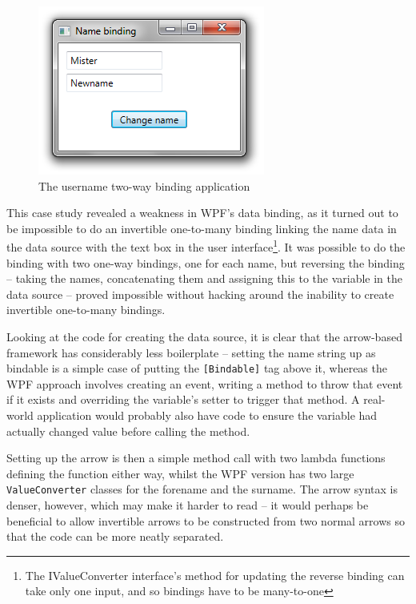 \documentclass[12pt,twoside,notitlepage]{report}
\begin{document}
\begin{figure}[!ht]
  \centering
  \includegraphics{fig/CaseStudyNameBinding.png}
  \caption{The username two-way binding application}
  \label{fig:case_study_name}
\end{figure}

This case study revealed a weakness in WPF's data binding, as it turned out to be impossible to do an invertible one-to-many binding linking the name data in the data source with the text box in the user interface\footnote{The IValueConverter interface's method for updating the reverse binding can take only one input, and so bindings have to be many-to-one}. It was possible to do the binding with two one-way bindings, one for each name, but reversing the binding -- taking the names, concatenating them and assigning this to the variable in the data source -- proved impossible without hacking around the inability to create invertible one-to-many bindings.

Looking at the code for creating the data source, it is clear that the arrow-based framework has considerably less boilerplate -- setting the name string up as bindable is a simple case of putting the \texttt{[Bindable]} tag above it, whereas the WPF approach involves creating an event, writing a method to throw that event if it exists and overriding the variable's setter to trigger that method. A real-world application would probably also have code to ensure the variable had actually changed value before calling the method.

Setting up the arrow is then a simple method call with two lambda functions defining the function either way, whilst the WPF version has two large \texttt{ValueConverter} classes for the forename and the surname. The arrow syntax is denser, however, which may make it harder to read -- it would perhaps be beneficial to allow invertible arrows to be constructed from two normal arrows so that the code can be more neatly separated.
\end{document}
